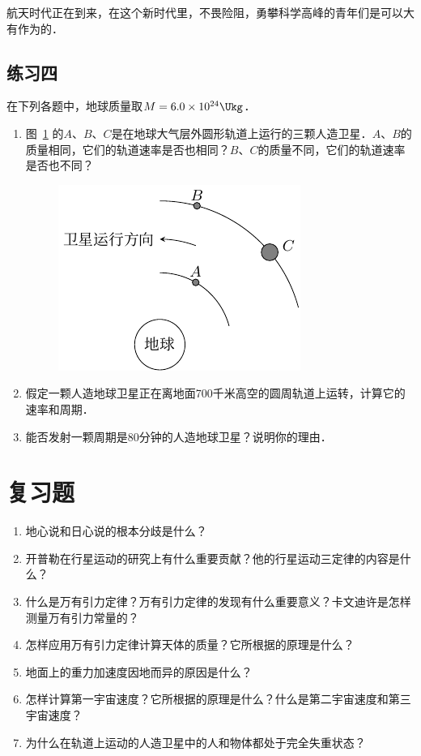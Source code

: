 航天时代正在到来，在这个新时代里，不畏险阻，勇攀科学高峰的青年们是可以大有作为的．	
	
\subsection*{练习四}

在下列各题中，地球质量取$M=6.0\times 10^{24} \Ukg$．
\begin{enumerate}
	\item 图~\ref{fig_A_5-8}  的$A$、$B$、$C$是在地球大气层外圆形轨道上运行的三颗人造卫星．$A$、$B$的质量相同，它们的轨道速率是否也相同？$B$、$C$的质量不同，它们的轨道速率是否也不同？

\begin{figure}[htbp]
	\centering
	\includegraphics{fig/A/5-8.pdf}
	\caption{}\label{fig_A_5-8}
\end{figure}

\item  假定一颗人造地球卫星正在离地面700千米高空的圆周轨道上运转，计算它的速率和周期．
\item 能否发射一颗周期是80分钟的人造地球卫星？说明你的理由．
\end{enumerate}
	
\section*{复习题}
\begin{enumerate}
	\item 地心说和日心说的根本分歧是什么？
	\item 开普勒在行星运动的研究上有什么重要贡献？他的行星运动三定律的内容是什么？
	\item 什么是万有引力定律？万有引力定律的发现有什么重要意义？卡文迪许是怎样测量万有引力常量的？
	\item 怎样应用万有引力定律计算天体的质量？它所根据的原理是什么？
	\item 地面上的重力加速度因地而异的原因是什么？
	\item 怎样计算第一宇宙速度？它所根据的原理是什么？什么是第二宇宙速度和第三宇宙速度？
	\item 为什么在轨道上运动的人造卫星中的人和物体都处于完全失重状态？
\end{enumerate}

